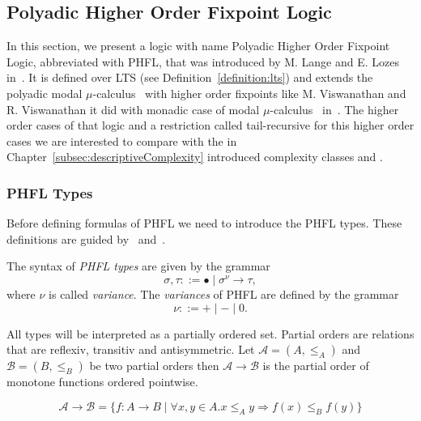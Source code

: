 
\subsection{Polyadic Higher Order Fixpoint Logic}\label{subsec:polyadicHigherOrderFixpointLogic}

In this section, we present a logic with name Polyadic Higher Order Fixpoint Logic, abbreviated with PHFL, that was
introduced by M. Lange and E. Lozes in~\cite{lange2014capturing}. It is defined over LTS (see
Definition~\ref{definition:lts}) and extends the polyadic modal $\mu$-calculus~\cite{otto1999bisimulation} with
higher order fixpoints like M. Viswanathan and R. Viswanathan it did with monadic case of modal
$\mu$-calculus~\cite{kozen1983results} in~\cite{viswanathan2004higher}. The higher order cases of that logic and a
restriction called tail-recursive for this higher order cases we are interested to compare with the in
Chapter~\ref{subsec:descriptiveComplexity} introduced complexity classes  and .

\subsubsection{PHFL Types}

Before defining formulas of PHFL we need to introduce the PHFL types. These definitions are guided
by~\cite{viswanathan2004higher} and~\cite{lange2014capturing}.

\begin{definition}
    The syntax of \emph{PHFL types} are given by the grammar
    \[\sigma, \tau ::= \bullet \mid \sigma^\nu \rightarrow \tau,\]
    where $\nu$ is called \textit{variance}. The \emph{variances} of PHFL are defined by the grammar
    \[\nu ::= + \mid - \mid 0.\]
\end{definition}

All types will be interpreted as a partially ordered set. Partial orders are relations that are reflexiv, transitiv
and antisymmetric. Let $\mathcal{A} = (A, \leq_A)$ and $\mathcal{B} = (B, \leq_B)$ be two partial orders then
$\mathcal{A} \rightarrow \mathcal{B}$ is the partial order of monotone functions ordered pointwise.

\[\mathcal{A} \rightarrow \mathcal{B} = \{f:A\rightarrow B \mid \forall x,y \in A. x\leq_A y\Rightarrow f(x)\leq_B f(y)\}\]

